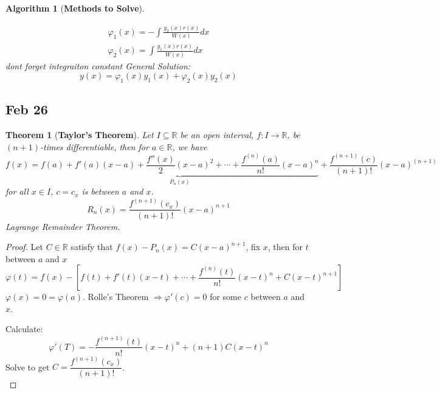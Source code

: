 \documentclass[12pt]{article}
\theoremstyle{plain}
\newtheorem{theorem}{Theorem}[subsection]
\newtheorem{algorithm}{Algorithm}[subsection]
\newcommand{\mR}{{\mathbb{R}}}
\begin{document}
\begin{algorithm}[\textbf{Methods to Solve}]
\begin{enumerate}
		\begin{align*}
			\varphi_1(x) = -\int\frac{y_2(x)r(x)}{W(x)}dx\\
			\varphi_2(x) = \int\frac{y_1(x)r(x)}{W(x)}dx 
		\end{align*}
		dont forget integraiton constant
		General Solution: 
		\[
			y(x) = \varphi_1(x) y_1(x) + \varphi_2(x)y_2(x)
		\]

		
	\end{enumerate}
	\end{algorithm}





\newpage
\subsection{Feb 26}
\begin{theorem}[\textbf{Taylor's Theorem}]
	Let $I \subseteq \mR$ be an open interval, $f:I\to \mR$, be $(n+1)$-times
	differentiable, then for $a \in \mR$, we have 
	\[
		f(x) 
		= \underbrace{f(a) + f'(a) (x-a) + \frac{f''(x)}2 (x-a)^2 + \cdots + 
		\frac{f^{(n)}(a)}{n!} (x-a)^n}_{P_n(x)} 
		+ \frac{f^{(n+1)}(c)}{(n+1)!} (x-a)^{(n+1)}
	\]
	for all $x \in I$, $c = c_x$ is between $a$ and $x$. 
	\[
		R_n(x) = \frac{f^{(n+1)}(c_x)}{(n+1)!} (x-a)^{n+1}
	\]
	Lagrange Remainder Theorem. 
\end{theorem}
\begin{proof}
	Let $C \in \mR$ satisfy that $f(x) - P_n(x) = C(x-a)^{n+1}$, fix $x$, then
	for $t$ between $a$ and $x$ 
	\[
		\varphi(t) = f(x) - [f(t) + f'(t) (x-t) + \cdots +
		\frac{f^{(n)}(t)}{n!}(x-t)^n + C(x-t)^{n+1}]
	\]
	$\varphi(x) = 0 =\varphi(a)$. Rolle's Theorem $\Rightarrow \varphi'(c) = 0$
	for some $c$ between $a$ and $x$. 

	Calculate: 
	\[
		\varphi'(T) = - \frac{f^{(n+1)}(t)}{n!}(x-t)^n + (n+1)C(x-t)^n
	\]
	Solve to get $C = \dfrac{f^{(n+1)}(c_x)}{(n+1)!}$.\\
\end{proof}
\end{document}

